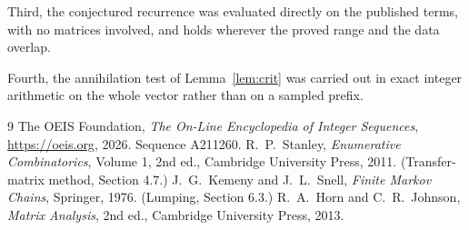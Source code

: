 \documentclass[11pt,a4paper]{article}
\theoremstyle{plain}
\theoremstyle{definition}
\begin{document}
Third, the conjectured recurrence was evaluated directly on the published terms, with no
matrices involved, and holds wherever the proved range and the data overlap.

Fourth, the annihilation test of Lemma~\ref{lem:crit} was carried out in exact integer
arithmetic on the whole vector rather than on a sampled prefix.

\begin{thebibliography}{9}
 The OEIS Foundation, \emph{The On-Line Encyclopedia of Integer
Sequences}, \url{https://oeis.org}, 2026. Sequence A211260.
 R.~P.~Stanley, \emph{Enumerative Combinatorics}, Volume 1, 2nd ed.,
Cambridge University Press, 2011. (Transfer-matrix method, Section 4.7.)
 J.~G.~Kemeny and J.~L.~Snell, \emph{Finite Markov Chains}, Springer, 1976.
(Lumping, Section 6.3.)
 R.~A.~Horn and C.~R.~Johnson, \emph{Matrix Analysis}, 2nd ed., Cambridge
University Press, 2013.
\end{thebibliography}
\end{document}
